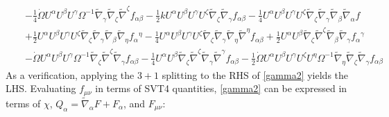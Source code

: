 \documentclass[10pt,letterpaper]{article}
\numberwithin{equation}{section}
\begin{document}
\begin{eqnarray}
&& -  \tfrac{1}{4} \dot{\Omega} U^{\alpha } U^{\beta } U^{\gamma } \Omega^{-1} \tilde{\nabla}_{\gamma }\tilde{\nabla}_{\zeta }\tilde{\nabla}^{\zeta }f_{\alpha \beta } -  \tfrac{1}{2} k U^{\alpha } U^{\beta } U^{\gamma } U^{\zeta } \tilde{\nabla}_{\zeta }\tilde{\nabla}_{\gamma }f_{\alpha \beta } -  \tfrac{1}{4} U^{\alpha } U^{\beta } U^{\gamma } U^{\zeta } \tilde{\nabla}_{\zeta }\tilde{\nabla}_{\gamma }\tilde{\nabla}_{\beta }\tilde{\nabla}_{\alpha }f \nonumber \\ 
&& + \tfrac{1}{2} U^{\alpha } U^{\beta } U^{\gamma } U^{\zeta } \tilde{\nabla}_{\zeta }\tilde{\nabla}_{\gamma }\tilde{\nabla}_{\beta }\tilde{\nabla}_{\eta }f_{\alpha }{}^{\eta } -  \tfrac{1}{4} U^{\alpha } U^{\beta } U^{\gamma } U^{\zeta } \tilde{\nabla}_{\zeta }\tilde{\nabla}_{\gamma }\tilde{\nabla}_{\eta }\tilde{\nabla}^{\eta }f_{\alpha \beta } + \tfrac{1}{2} U^{\alpha } U^{\beta } \tilde{\nabla}_{\zeta }\tilde{\nabla}^{\zeta }\tilde{\nabla}_{\beta }\tilde{\nabla}_{\gamma }f_{\alpha }{}^{\gamma } \nonumber \\ 
&& -  \dot{\Omega} U^{\alpha } U^{\beta } U^{\gamma } \Omega^{-1} \tilde{\nabla}_{\zeta }\tilde{\nabla}^{\zeta }\tilde{\nabla}_{\gamma }f_{\alpha \beta } -  \tfrac{1}{4} U^{\alpha } U^{\beta } \tilde{\nabla}_{\zeta }\tilde{\nabla}^{\zeta }\tilde{\nabla}_{\gamma }\tilde{\nabla}^{\gamma }f_{\alpha \beta }  -  \tfrac{1}{2} \dot{\Omega} U^{\alpha } U^{\beta } U^{\gamma } U^{\zeta } U^{\eta } \Omega^{-1} \tilde{\nabla}_{\eta }\tilde{\nabla}_{\zeta }\tilde{\nabla}_{\gamma }f_{\alpha \beta }
\label{gamma2}
\end{eqnarray} 
As a verification, applying the $3+1$ splitting to the RHS of \eqref{gamma2} yields the LHS. Evaluating $f_{\mu\nu}$ in terms of SVT4 quantities, \eqref{gamma2} can be expressed in terms of $\chi$, $Q_\alpha = \tilde\nabla_\alpha F + F_\alpha$, and $F_{\mu\nu}$:
\end{document}
